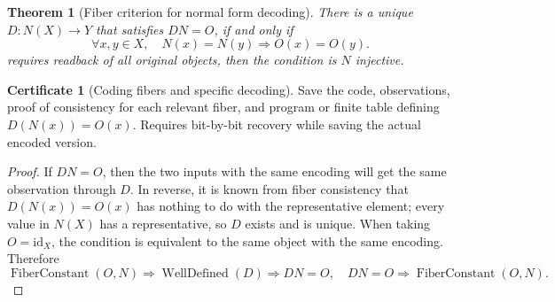 \documentclass[12pt,a4paper,openany,notitlepage]{report}
\theoremstyle{plain}
\newtheorem{theorem}{Theorem}[chapter]
\theoremstyle{definition}
\newtheorem*{certificate}{Certificate}
\theoremstyle{remark}
\begin{document}
\begin{CJK*}
\begin{theorem}
[Fiber criterion for normal form decoding]\label{hgov:thm:nf}
There is a unique $D:N(X)\to Y$ that satisfies $DN=O$, if and only if \[
\forall x,y\in X,\quad N(x)=N(y)\Rightarrow O(x)=O(y).
\] requires readback of all original objects, then the condition is $N$ injective.\end{theorem}
\begin{certificate}
[Coding fibers and specific decoding]Save the code, observations, proof of consistency for each relevant fiber, and program or finite table defining $D(N(x))=O(x)$. Requires bit-by-bit recovery while saving the actual encoded version.\end{certificate}
\begin{proof}
If $DN=O$, then the two inputs with the same encoding will get the same observation through $D$. In reverse, it is known from fiber consistency that $D(N(x))=O(x)$ has nothing to do with the representative element; every value in $N(X)$ has a representative, so $D$ exists and is unique. When taking $O=\mathrm{id}_X$, the condition is equivalent to the same object with the same encoding. Therefore \[
\operatorname{FiberConstant}(O,N)
\Rightarrow\operatorname{WellDefined}(D)
\Rightarrow DN=O,
\quad
DN=O\Rightarrow\operatorname{FiberConstant}(O,N).
\]\end{proof}



\end{CJK*}
\end{document}

